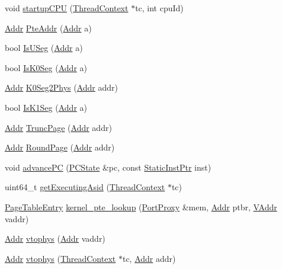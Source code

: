 \begin{DoxyCompactItemize}
\item 
void \hyperlink{namespaceAlphaISA_a65b7ec798c399b980dc23332b8684a0b}{startupCPU} (\hyperlink{classThreadContext}{ThreadContext} $\ast$tc, int cpuId)
\item 
\hyperlink{classm5_1_1params_1_1Addr}{Addr} \hyperlink{namespaceAlphaISA_a7011d6b73edace006e7c43b09d9ae703}{PteAddr} (\hyperlink{classm5_1_1params_1_1Addr}{Addr} a)
\item 
bool \hyperlink{namespaceAlphaISA_a2451f4cdda3759a112904a5bf9adc948}{IsUSeg} (\hyperlink{classm5_1_1params_1_1Addr}{Addr} a)
\item 
bool \hyperlink{namespaceAlphaISA_ae30e2a62fc7b8017254375687db343ee}{IsK0Seg} (\hyperlink{classm5_1_1params_1_1Addr}{Addr} a)
\item 
\hyperlink{classm5_1_1params_1_1Addr}{Addr} \hyperlink{namespaceAlphaISA_a3429ac3cc50f87a6522ce09b611ea974}{K0Seg2Phys} (\hyperlink{classm5_1_1params_1_1Addr}{Addr} addr)
\item 
bool \hyperlink{namespaceAlphaISA_ab93fa394a0732944836267b5ca194e99}{IsK1Seg} (\hyperlink{classm5_1_1params_1_1Addr}{Addr} a)
\item 
\hyperlink{classm5_1_1params_1_1Addr}{Addr} \hyperlink{namespaceAlphaISA_aa30de8739aa107005b5f69984513fc8f}{TruncPage} (\hyperlink{classm5_1_1params_1_1Addr}{Addr} addr)
\item 
\hyperlink{classm5_1_1params_1_1Addr}{Addr} \hyperlink{namespaceAlphaISA_a31ed8a5ee9eabb285172c3e8b40e0427}{RoundPage} (\hyperlink{classm5_1_1params_1_1Addr}{Addr} addr)
\item 
void \hyperlink{namespaceAlphaISA_add1b209af0281827d9ac0a67747a3bf7}{advancePC} (\hyperlink{classGenericISA_1_1SimplePCState}{PCState} \&pc, const \hyperlink{classRefCountingPtr}{StaticInstPtr} inst)
\item 
uint64\_\-t \hyperlink{namespaceAlphaISA_abb48fd2963e6ebf6b013e5546f1f7d87}{getExecutingAsid} (\hyperlink{classThreadContext}{ThreadContext} $\ast$tc)
\item 
\hyperlink{structAlphaISA_1_1PageTableEntry}{PageTableEntry} \hyperlink{namespaceAlphaISA_a3a06f643871ad1e52bbf9892022e1ff8}{kernel\_\-pte\_\-lookup} (\hyperlink{classPortProxy}{PortProxy} \&mem, \hyperlink{classm5_1_1params_1_1Addr}{Addr} ptbr, \hyperlink{structAlphaISA_1_1VAddr}{VAddr} vaddr)
\item 
\hyperlink{classm5_1_1params_1_1Addr}{Addr} \hyperlink{namespaceAlphaISA_a3828815371ad2b0a1be60abdcb405cf9}{vtophys} (\hyperlink{classm5_1_1params_1_1Addr}{Addr} vaddr)
\item 
\hyperlink{classm5_1_1params_1_1Addr}{Addr} \hyperlink{namespaceAlphaISA_af1014ad6d87b8a97e9d660234574a565}{vtophys} (\hyperlink{classThreadContext}{ThreadContext} $\ast$tc, \hyperlink{classm5_1_1params_1_1Addr}{Addr} addr)
\end{DoxyCompactItemize}
